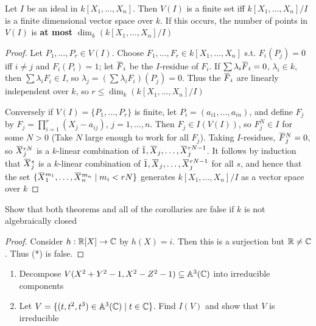 \documentclass[11pt]{article}
\begin{document}
\begin{corollary}[]
Let \(I\) be an ideal in \(k[X_1,\dots,X_n]\). Then \(V(I)\) is a finite set iff \(k[X_1,\dots,X_n]/I\) is
a finite dimensional vector space over \(k\). If this occurs, the number of points in \(V(I)\)
is \textbf{at most} \(\dim_k(k[X_1,\dots,X_n]/I)\)
\end{corollary}

\begin{proof}
Let \(P_1,\dots,P_r\in V(I)\). Choose \(F_1,\dots,F_r\in k[X_1,\dots,X_n]\) s.t. \(F_i(P_j)=0\) iff \(i\neq j\)
and \(F_i(P_i)=1\); let \(\barF_i\) be the \(I\)-residue of \(F_i\). If \(\sum\lambda_i\barF_i=0\), \(\lambda_i\in k\),
then \(\sum\lambda_iF_i\in I\), so \(\lambda_j=(\sum\lambda_iF_i)(P_j)=0\). Thus the \(\barF_i\) are linearly independent
over \(k\), so \(r\le\dim_k(k[X_1,\dots,X_n]/I)\)

Conversely if \(V(I)=\{P_1,\dots,P_r\}\) is finite, let \(P_i=(a_{i1},\dots,a_{in})\), and define \(F_j\)
by \(F_j=\prod_{i=1}^r(X_j-a_{ij})\), \(j=1,\dots,n\). Then \(F_j\in I(V(I))\), so \(F_j^N\in I\) for
some \(N>0\) (Take \(N\) large enough to work for all \(F_j\)).
Taking \(I\)-residues, \(\barF_j^N=0\), so \(\barX_j^{rN}\) is a \(k\)-linear combination
of \(\bar{1},\barX_j,\dots,\barX_j^{rN-1}\). It follows by induction that \(\barX_j^s\) is
a \(k\)-linear combination of \(\bar{1},\barX_j,\dots,\barX_j^{rN-1}\) for all \(s\), and hence that
the set \(\{\barX_1^{m_1},\dots,\barX_n^{m_n}\mid m_i<rN\}\) generates \(k[X_1,\dots,X_n]/I\) as a vector space
over \(k\)
\end{proof}

\begin{exercise}
\label{ex1.32}
Show that both theorems and all of the corollaries are false if \(k\) is not algebraically closed
\end{exercise}

\begin{proof}
Consider \(h:\mathbb{R}[X]\to\mathbb{C}\) by \(h(X)=i\). Then this is a surjection but \(\mathbb{R}\neq\mathbb{C}\). Thus (*) is false.
\end{proof}

\begin{exercise}
\begin{enumerate}
\item Decompose \(V(X^2+Y^2-1,X^2-Z^2-1)\subseteq\mathbb{A}^3(\mathbb{C})\) into irreducible components
\item Let \(V=\{(t,t^2,t^3)\in\mathbb{A}^3(\mathbb{C})\mid t\in\mathbb{C}\}\). Find \(I(V)\) and show that \(V\) is irreducible
\end{enumerate}
\end{exercise}
\end{document}
